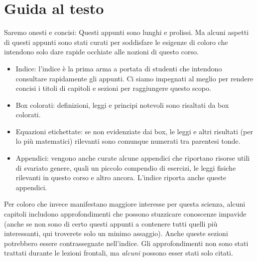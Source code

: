 \chapter*{Guida al testo}
Saremo onesti e concisi: Questi appunti sono lunghi e prolissi.
Ma alcuni aspetti di questi appunti sono
stati curati per soddisfare le esigenze di coloro che intendono solo dare rapide
occhiate alle nozioni di questo corso.

\begin{itemize}
    \item Indice: l'indice è la prima arma a portata di studenti che intendono
    consultare rapidamente gli appunti. Ci siamo impegnati al meglio per rendere
    concisi i titoli di capitoli e sezioni per raggiungere questo scopo.

    \item Box colorati: definizioni, leggi e principi notevoli sono risaltati
    da box colorati.
    
    \item Equazioni etichettate: se non evidenziate dai box, le leggi e altri
    risultati (per lo più matematici) rilevanti sono comunque numerati tra
    parentesi tonde.

    \item Appendici: vengono anche curate alcune appendici che riportano risorse
    utili di svariato genere, quali un piccolo compendio di esercizi, le leggi
    fisiche rilevanti in questo corso e altro ancora. L'indice riporta anche
    queste appendici.
\end{itemize}

Per coloro che invece manifestano maggiore interesse per questa scienza, alcuni
capitoli includono approfondimenti che possono stuzzicare conoscenze impavide (anche
se non sono di certo questi appunti a contenere tutti quelli più interessanti,
qui troverete solo un minimo assaggio). Anche queste sezioni potrebbero essere
contrassegnate nell'indice.
Gli approfondimenti non sono stati trattati durante le lezioni frontali, ma
\textit{alcuni} possono esser stati solo citati.

